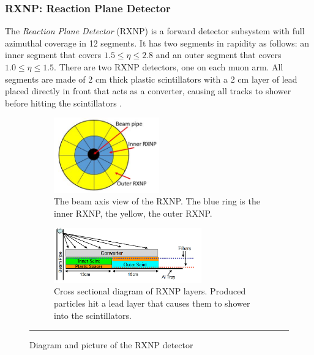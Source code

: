 \subsubsection{RXNP: Reaction Plane Detector}
The \textit{Reaction Plane Detector} (RXNP) is a forward detector subsystem \citep{RXNPfocus} with full azimuthal coverage in 12 segments. It has two segments in rapidity as follows: an inner segment that covers $1.5 \leq \eta \leq 2.8$ and an outer segment that covers $1.0 \leq \eta \leq 1.5$. There are two RXNP detectors, one on each muon arm. All segments are made of 2 cm thick plastic scintillators with a 2 cm layer of lead placed directly in front that acts as a converter, causing all tracks to shower before hitting the scintillators \citep{RXNPfocusER}.  
\begin{figure}
\begin{subfigure}[h]{1\textwidth}
    \centering
    \includegraphics[width=0.5\textwidth]{Figures/RXNPdiagram.JPG}
    \caption{The beam axis view of the RXNP. The blue ring is the inner RXNP, the yellow, the outer RXNP.}

\end{subfigure}
\begin{subfigure}[h]{1\textwidth}
\centering
  \includegraphics[width=0.7\textwidth]{Figures/RXNPschem.jpg}
  \caption{Cross sectional diagram of RXNP layers. Produced particles hit a lead layer that causes them to shower into the scintillators.}
\end{subfigure}

  \rule{35em}{0.5pt}
\caption[Diagram and picture of the RXNP detector]{Diagram and picture of the RXNP detector}
      \label{fig:RXNP}
\end{figure}

